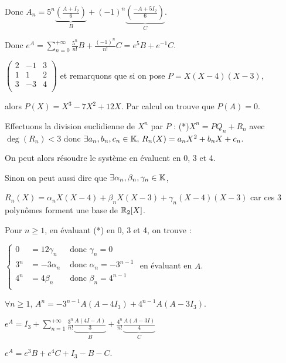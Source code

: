 \begin{exemple}
    Donc $A_n = 5^n \underbrace{\left( \frac{A + I_2} 6 \right)}_{B} + (-1)^n \underbrace{\left( \frac{-A + 5 I_2}{6} \right)}_{C}$.

    Donc $\displaystyle e^A = \sum_{n = 0}^{+\infty} \frac{5^n}{n!}B + \frac{(-1)^n}{n!} C = e^5 B + e^{-1} C$.

    
    \svspace $\begin{pmatrix}
        2 & -1 & 3\\
        1 & 1 & 2 \\
        3 & -3 & 4 \\
    \end{pmatrix}$ et remarquons que si on pose $P = X(X - 4)(X - 3)$, 
    
    alors $P(X) = X^3 - 7 X^2 + 12X$. Par calcul on trouve que $P(A) = 0$.

    Effectuons la division euclidienne de $X^n$ par $P$ : (*)$X^n = P Q_n + R_n$ avec 
    $\deg(R_n) < 3$ donc $\exists a_n, b_n, c_n \in \mathbb{K}, \, R_n(X) = a_n X^2 + b_n X + c_n$.

    On peut alors résoudre le système en évaluent en 0, 3 et 4. 

    Sinon on peut aussi dire que $\exists \alpha_n, \beta_n, \gamma_n \in \mathbb{K}$,  
    
    $R_n(X) = \alpha_n X(X - 4) + \beta_n X(X - 3) + \gamma_n (X - 4)(X - 3)$
    car ces 3 polynômes forment une base de $\mathbb{R}_2[X]$.

    Pour $n \geqslant 1$, en évaluant (*) en 0, 3 et 4, on trouve : 

    $\left\{ \begin{array}{rcl}
        0 & = 12 \gamma_n & \text{ donc } \gamma_n = 0\\
        3^n & = -3 \alpha_n & \text{ donc } \alpha_n = - 3^{n - 1} \\
        4^n & = 4 \beta_n & \text{ donc } \beta_n = 4^{n - 1}\\
    \end{array} \right.
    $ en évaluant en $A$. 

    $\forall n \geqslant 1, \, A^n = -3^{n - 1} A(A - 4 I_3) + 4^{n - 1} A(A - 3 I_3)$.

    $\displaystyle e^A = I_3 + \sum_{n = 1}^{+\infty} \frac{3^n}{n!} \underbrace{\frac{A(4I - A)}{3}}_B + \frac{4^n}{n!} \underbrace{\frac{A(A - 3 I)}{4}}_C$

    $e^A = e^3 B + e^4 C + I_3 - B - C$.
\end{exemple}

